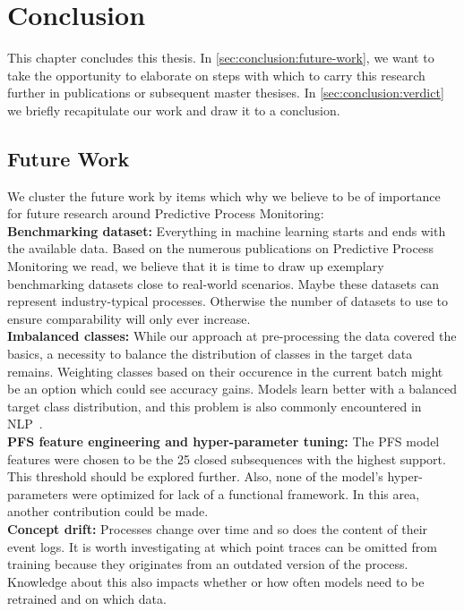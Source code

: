 \chapter{Conclusion} \label{chap:conclusion}
This chapter concludes this thesis. In \autoref{sec:conclusion:future-work}, we want to take the opportunity to elaborate on steps with which to carry this research further in publications or subsequent master thesises. In \autoref{sec:conclusion:verdict} we briefly recapitulate our work and draw it to a conclusion.

\section{Future Work} \label{sec:conclusion:future-work}
We cluster the future work by items which why we believe to be of importance for future research around Predictive Process Monitoring:\\

\noindent\textbf{Benchmarking dataset:} Everything in machine learning starts and ends with the available data. Based on the numerous publications on Predictive Process Monitoring we read, we believe that it is time to draw up exemplary benchmarking datasets close to real-world scenarios. Maybe these datasets can represent industry-typical processes. Otherwise the number of datasets to use to ensure comparability will only ever increase.\\

\noindent\textbf{Imbalanced classes:} While our approach at pre-processing the data covered the basics, a necessity to balance the distribution of classes in the target data remains. Weighting classes based on their occurence in the current batch might be an option which could see accuracy gains. Models learn better with a balanced target class distribution, and this problem is also commonly encountered in NLP~\cite{web:stackoverflow-keras-class-weights}.\\

\noindent\textbf{PFS feature engineering and hyper-parameter tuning:} The PFS model features  were chosen to be the 25 closed subsequences with the highest support. This threshold should be explored further. Also, none of the model's hyper-parameters were optimized for lack of a functional framework. In this area, another contribution could be made.\\

\noindent\textbf{Concept drift:} Processes change over time and so does the content of their event logs. It is worth investigating at which point traces can be omitted from training because they originates from an outdated version of the process. Knowledge about this also impacts whether or how often models need to be retrained and on which data.\\


